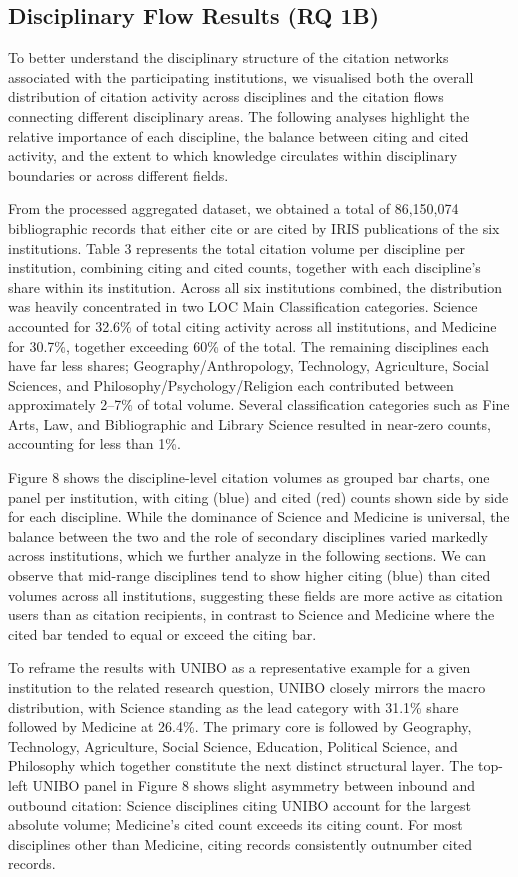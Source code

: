 \documentclass[year=2026]{cup-journal}
\begin{document}
\subsection{Disciplinary Flow Results (RQ 1B)}

To better understand the disciplinary structure of the citation networks associated with the participating institutions, we visualised both the overall distribution of citation activity across disciplines and the citation flows connecting different disciplinary areas. The following analyses highlight the relative importance of each discipline, the balance between citing and cited activity, and the extent to which knowledge circulates within disciplinary boundaries or across different fields.

From the processed aggregated dataset, we obtained a total of 86,150,074 bibliographic records that either cite or are cited by IRIS publications of the six institutions. Table 3 represents the total citation volume per discipline per institution, combining citing and cited counts, together with each discipline's share within its institution. Across all six institutions combined, the distribution was heavily concentrated in two LOC Main Classification categories. Science accounted for 32.6\% of total citing activity across all institutions, and Medicine for 30.7\%, together exceeding 60\% of the total. The remaining disciplines each have far less shares; Geography/Anthropology, Technology, Agriculture, Social Sciences, and Philosophy/Psychology/Religion each contributed between approximately 2–7\% of total volume. Several classification categories such as Fine Arts, Law, and Bibliographic and Library Science resulted in near-zero counts, accounting for less than 1\%.

Figure 8 shows the discipline-level citation volumes as grouped bar charts, one panel per institution, with citing (blue) and cited (red) counts shown side by side for each discipline. While the dominance of Science and Medicine is universal, the balance between the two and the role of secondary disciplines varied markedly across institutions, which we further analyze in the following sections. We can observe that mid-range disciplines tend to show higher citing (blue) than cited volumes across all institutions, suggesting these fields are more active as citation users than as citation recipients, in contrast to Science and Medicine where the cited bar tended to equal or exceed the citing bar.

To reframe the results with UNIBO as a representative example for a given institution to the related research question, UNIBO closely mirrors the macro distribution, with Science standing as the lead category with 31.1\% share followed by Medicine at 26.4\%. The primary core is followed by Geography, Technology, Agriculture, Social Science, Education, Political Science, and Philosophy which together constitute the next distinct structural layer. The top-left UNIBO panel in Figure 8 shows slight asymmetry between inbound and outbound citation: Science disciplines citing UNIBO account for the largest absolute volume; Medicine’s cited count exceeds its citing count. For most disciplines other than Medicine, citing records consistently outnumber cited records.
\end{document}
